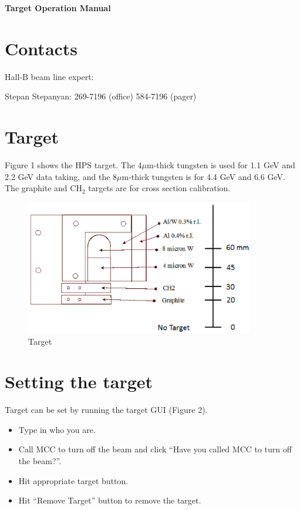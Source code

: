 \documentclass[12pt]{report}
\begin{document}
\begin{center}
{\LARGE\bf Target Operation Manual}
\end{center}

\section{Contacts}

\noindent
Hall-B beam line expert: 

\noindent
Stepan Stepanyan: 269-7196 (office) 584-7196 (pager)

\section{\bf Target}

Figure 1 shows the HPS target. The 4$\mu$m-thick tungsten is used for 1.1 GeV and 2.2 GeV data taking, and the 8$\mu$m-thick tungsten is for 4.4 GeV and 6.6 GeV. The graphite and CH$_2$ targets are for cross section calibration.

\begin{figure}[ht!]
\centering
\includegraphics[width=10cm]{target.eps}
\caption{Target}
\label{target}
\end{figure}

\section{\bf Setting the target}

Target can be set by running the target GUI (Figure 2).

\begin{itemize}
\item
Type in who you are.
\item
Call MCC to turn off the beam and click ``Have you called MCC to turn off the beam?''.
\item
Hit appropriate target button.
\item 
Hit ``Remove Target'' button to remove the target.
\end{itemize}
\end{document}
